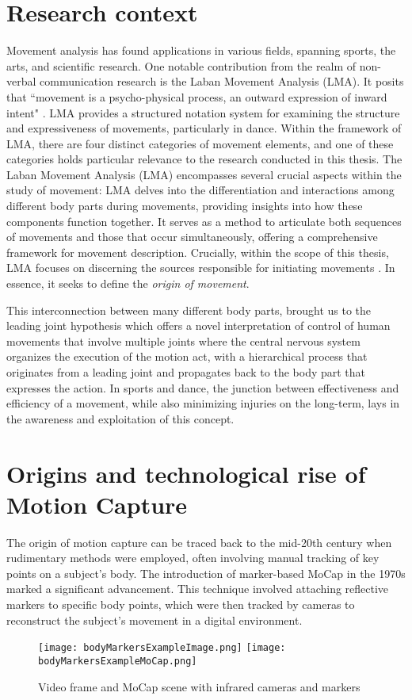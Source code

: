\section{Research context}
Movement analysis has found applications in various fields, spanning sports, the arts, and scientific research. 
One notable contribution from the realm of non-verbal communication research is the Laban Movement Analysis (LMA). 
It posits that “movement is a psycho-physical process, an outward expression of inward intent" \cite{Groff1995LabanMA}. 
LMA provides a structured notation system for examining the structure and expressiveness of movements, particularly in dance.
Within the framework of LMA, there are four distinct categories of movement elements, and one of these categories holds particular relevance to the research conducted in this thesis. 
The Laban Movement Analysis (LMA) encompasses several crucial aspects within the study of movement:
LMA delves into the differentiation and interactions among different body parts during movements, providing insights into how these components function together.
It serves as a method to articulate both sequences of movements and those that occur simultaneously, offering a comprehensive framework for movement description.
Crucially, within the scope of this thesis, LMA focuses on discerning the sources responsible for initiating movements \cite{zhao2001synthesis}.
In essence, it seeks to define the \textit{origin of movement}.  

This interconnection between many different body parts, brought us to the leading joint hypothesis \cite{dounskaia:2010} 
which offers a novel interpretation of control of human movements that involve multiple joints 
where the central nervous system organizes the execution of the motion act, with a hierarchical process 
that originates from a leading joint and propagates back to the body part that expresses the action. 
In sports and dance, the junction between effectiveness and efficiency of a movement, while also minimizing injuries on the long-term, 
lays in the awareness and exploitation of this concept. 

\section{Origins and technological rise of Motion Capture}
The origin of motion capture can be traced back to the mid-20th century when rudimentary methods were employed, 
often involving manual tracking of key points on a subject's body. 
The introduction of marker-based MoCap in the 1970s marked a significant advancement. 
This technique involved attaching reflective markers to specific body points, 
which were then tracked by cameras to reconstruct the subject's movement in a digital environment. 
\begin{figure}[H]
    \centering
    \texttt{[image: bodyMarkersExampleImage.png]}
    \texttt{[image: bodyMarkersExampleMoCap.png]}
    \caption{Video frame and MoCap scene with infrared cameras and markers}
    \label{fig:common}
\end{figure}

